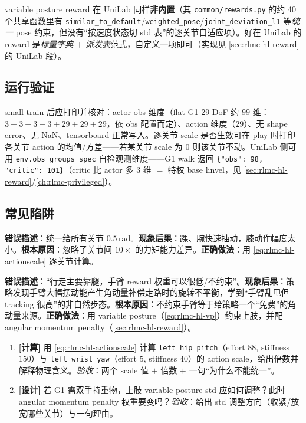 variable posture reward 在 UniLab 同样\textbf{非内置}（其 \texttt{common/\allowbreak rewards.\allowbreak py} 的约 40 个共享函数里有 \texttt{similar\_to\_default}/\allowbreak\texttt{weighted\_pose}/\allowbreak\texttt{joint\_deviation\_l1} 等\emph{统一} pose 约束，但没有“按速度状态切 std 表”的逐关节自适应项）。好在 UniLab 的 reward 是\emph{标量字典 $+$ 派发表}范式，自定义一项即可（实现见 \cref{sec:rlmc-hl-reward} 的 UniLab 段）。

\subsection{运行验证}
small train 后应打印并核对：actor obs 维度（flat G1 29-DoF 约 $99$ 维：$3+3+3+3+29+29+29$，依 obs 配置而定）、action 维度（$29$）、无 shape error、无 NaN、tensorboard 正常写入。逐关节 scale 是否生效可在 play 时打印各关节 action 的均值/方差——若某关节 scale 为 $0$ 则该关节不动。UniLab 侧可用 \texttt{env.\allowbreak obs\_groups\_spec} 自检观测维度——G1 walk 返回 \texttt{\{"obs": 98, "critic": 101\}}（critic 比 actor 多 $3$ 维 $=$ 特权 base linvel，见 \cref{sec:rlmc-hl-reward}/\cref{ch:rlmc-privileged}）。

\subsection{常见陷阱}
\begin{pitfall}
\textbf{错误描述}：统一给所有关节 $0.5$\,rad。\textbf{现象后果}：踝、腕快速抽动，膝动作幅度太小。\textbf{根本原因}：忽略了关节间 $10\times$ 的力矩能力差异。\textbf{正确做法}：用 \eqref{eq:rlmc-hl-actionscale} 逐关节计算。
\end{pitfall}

\begin{pitfall}[把手臂当成不重要的关节]
\textbf{错误描述}：“行走主要靠腿，手臂 reward 权重可以很低/不约束”。\textbf{现象后果}：策略发现手臂大幅摆动能产生角动量补偿走路时的旋转不平衡，学到“手臂乱甩但 tracking 很高”的非自然步态。\textbf{根本原因}：不约束手臂等于给策略一个“免费”的角动量来源。\textbf{正确做法}：用 variable posture（\eqref{eq:rlmc-hl-vp}）约束上肢，并配 angular momentum penalty（\cref{sec:rlmc-hl-reward}）。
\end{pitfall}

\begin{practice}[本节动手]
\begin{enumerate}
  \item \textbf{[计算]} 用 \eqref{eq:rlmc-hl-actionscale} 计算 \texttt{left\_hip\_pitch}（effort $88$, stiffness $150$）与 \texttt{left\_wrist\_yaw}（effort $5$, stiffness $40$）的 action scale，给出倍数并解释物理含义。\emph{验收}：两个 scale 值 $+$ 倍数 $+$ 一句“为什么不能统一”。
  \item \textbf{[设计]} 若 G1 需双手持重物，上肢 variable posture std 应如何调整？此时 angular momentum penalty 权重要变吗？\emph{验收}：给出 std 调整方向（收紧/放宽哪些关节）与一句理由。
\end{enumerate}
\end{practice}

